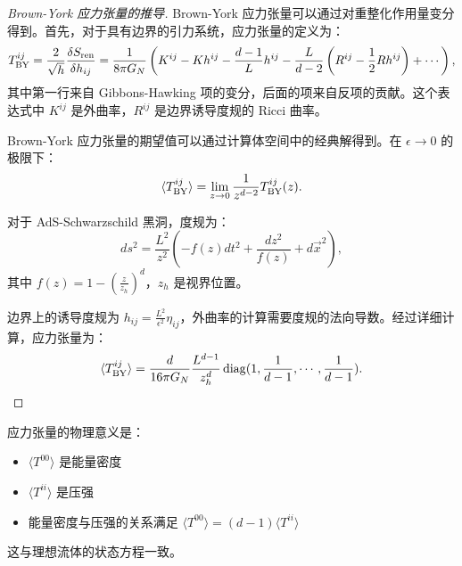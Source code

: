 \begin{proof}[Brown-York 应力张量的推导]
Brown-York 应力张量可以通过对重整化作用量变分得到。首先，对于具有边界的引力系统，应力张量的定义为\cite{Brown1993}：
\begin{equation}
    T^{ij}_{\rm BY} = \frac{2}{\sqrt{h}} \frac{\delta S_{\rm ren}}{\delta h_{ij}} = \frac{1}{8\pi G_N} \left( K^{ij} - K h^{ij} - \frac{d-1}{L} h^{ij} - \frac{L}{d-2} \left( R^{ij} - \frac{1}{2} R h^{ij} \right) + \cdots \right),
\end{equation}
其中第一行来自 Gibbons-Hawking 项的变分，后面的项来自反项的贡献。这个表达式中 $K^{ij}$ 是外曲率，$R^{ij}$ 是边界诱导度规的 Ricci 曲率。

Brown-York 应力张量的期望值可以通过计算体空间中的经典解得到。在 $\epsilon \to 0$ 的极限下\cite{Balasubramanian1999}：
\begin{equation}
    \langle T^{ij}_{\rm BY} \rangle = \lim_{z \to 0} \frac{1}{z^{d-2}} T^{ij}_{\rm BY}(z).
\end{equation}

对于 AdS-Schwarzschild 黑洞，度规为：
\begin{equation}
    ds^2 = \frac{L^2}{z^2} \left( -f(z) dt^2 + \frac{dz^2}{f(z)} + d\vec{x}^2 \right),
\end{equation}
其中 $f(z) = 1 - \left(\frac{z}{z_h}\right)^d$，$z_h$ 是视界位置。

边界上的诱导度规为 $h_{ij} = \frac{L^2}{\epsilon^2} \eta_{ij}$，外曲率的计算需要度规的法向导数。经过详细计算，应力张量为：
\begin{equation}
    \langle T^{ij}_{\rm BY} \rangle = \frac{d}{16\pi G_N} \frac{L^{d-1}}{z_h^d} \, \mathrm{diag}(1, \frac{1}{d-1}, \cdots, \frac{1}{d-1}).
\end{equation}
\end{proof}

\begin{example}[应力张量的物理意义]
应力张量的物理意义是：
\begin{itemize}
    \item $\langle T^{00} \rangle$ 是能量密度
    \item $\langle T^{ii} \rangle$ 是压强
    \item 能量密度与压强的关系满足 $\langle T^{00} \rangle = (d-1) \langle T^{ii} \rangle$
\end{itemize}
这与理想流体的状态方程一致。
\end{example}

